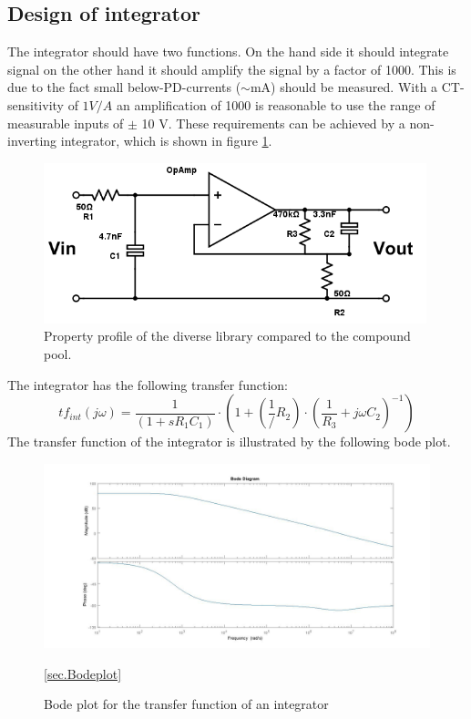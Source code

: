 \subsection{Design of integrator}
The integrator should have two functions. On the hand side it should integrate signal on the other hand it should amplify the signal by a factor of 1000. This is due to the fact small below-PD-currents ($\sim$mA) should be measured. With a CT-sensitivity of $1V/A$ an amplification of 1000 is reasonable to use the range of measurable inputs of $\pm$ 10 V. These requirements can be achieved by a non-inverting integrator, which is shown in figure  \ref{fig.circuit}. 

\begin{figure}
\includegraphics[width=0.99\textwidth]{figures/Method/integrator/circuit.png}
    \caption{Property profile of the diverse library compared to the compound pool.}
    \label{fig.circuit}
    \end{figure}	


The integrator has the following transfer function: \\
\begin{equation}
	tf_{int}(j \omega)=\frac{1}{(1+s R_1 C_1)}\cdot(1+(\frac{1}/{R_2})\cdot(\frac{1}{R_3}+j \omega C_2)^{-1})
\end{equation}
The transfer function of the integrator is illustrated by the following bode plot. 

\begin{figure}

\includegraphics[width=\textwidth]{figures/Method/integrator/transferfunction_int.jpg}

\caption[Kurze Abbildungsbeschreibung]{Bode plot for the transfer function of an integrator } \ref{sec.Bodeplot}
\end{figure}

